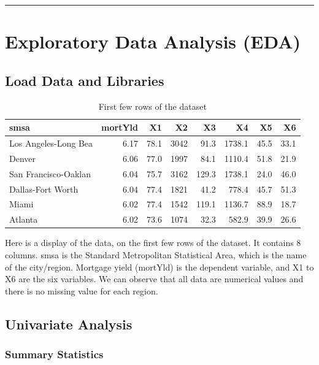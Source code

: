 \documentclass[
  11pt,
]{article}
\begin{document}
\begin{center}\rule{0.5\linewidth}{0.5pt}\end{center}

\section{Exploratory Data Analysis
(EDA)}\label{exploratory-data-analysis-eda}

\subsection{Load Data and Libraries}\label{load-data-and-libraries}

\begingroup\fontsize{8}{10}\selectfont

\begin{longtable}[t]{lrrrrrrr}
\caption{\label{tab:unnamed-chunk-1}First few rows of the dataset}\\
\toprule
smsa & mortYld & X1 & X2 & X3 & X4 & X5 & X6\\
\midrule
Los Angeles-Long Bea & 6.17 & 78.1 & 3042 & 91.3 & 1738.1 & 45.5 & 33.1\\
Denver & 6.06 & 77.0 & 1997 & 84.1 & 1110.4 & 51.8 & 21.9\\
San Francisco-Oaklan & 6.04 & 75.7 & 3162 & 129.3 & 1738.1 & 24.0 & 46.0\\
Dallas-Fort Worth & 6.04 & 77.4 & 1821 & 41.2 & 778.4 & 45.7 & 51.3\\
Miami & 6.02 & 77.4 & 1542 & 119.1 & 1136.7 & 88.9 & 18.7\\
\addlinespace
Atlanta & 6.02 & 73.6 & 1074 & 32.3 & 582.9 & 39.9 & 26.6\\
\bottomrule
\end{longtable}
\endgroup{}

Here is a display of the data, on the first few rows of the dataset. It
contains 8 columns. smsa is the Standard Metropolitan Statistical Area,
which is the name of the city/region. Mortgage yield (mortYld) is the
dependent variable, and X1 to X6 are the six variables. We can observe
that all data are numerical values and there is no missing value for
each region.

\subsection{Univariate Analysis}\label{univariate-analysis}

\subsubsection{Summary Statistics}\label{summary-statistics}
\end{document}
